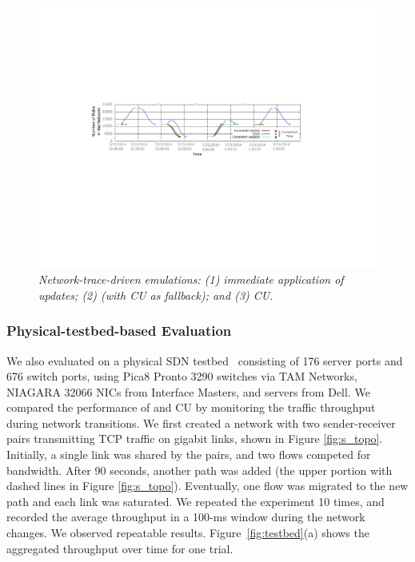 \begin{figure}[!ht]
  \vspace{-0.1in}
  \centering
  \includegraphics[width=\textwidth]{figs/count.pdf}
  \vspace{-0.3in}
  \caption{\em Network-trace-driven emulations: (1) immediate application of updates; (2) \name (with CU as fallback); and (3) CU.}
  \vspace{-0.2in}
  \label{fig:cise}
\end{figure}


\subsubsection{Physical-testbed-based Evaluation}
We also evaluated \name on a physical SDN testbed~\cite{ocean}
consisting of 176 server ports and 676 switch ports, using Pica8 Pronto 3290 switches via TAM Networks, NIAGARA 32066 NICs from Interface Masters, and servers from Dell.
We compared the performance of \name and CU by monitoring the traffic
throughput during network transitions. We first created a network
with two sender-receiver pairs transmitting TCP traffic on gigabit links, 
shown in Figure \ref{fig:s_topo}. Initially, a single link was shared by the
pairs, and two flows competed for bandwidth.  After 90 seconds, another path
was added %
(the upper portion with dashed lines in
Figure \ref{fig:s_topo}). Eventually, one flow was migrated to
the new path and each link was saturated. 
We repeated the experiment 10 times, and recorded the average throughput in a 100-ms window during the network changes. We observed repeatable results.  Figure~\ref{fig:testbed}(a) shows the aggregated
throughput over time for one trial.

